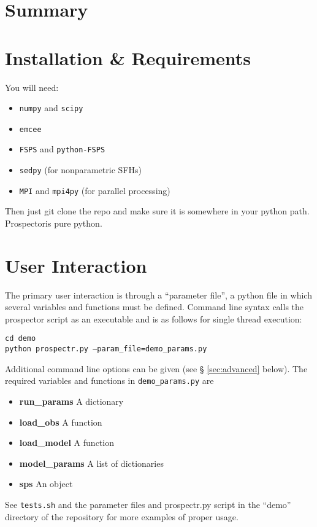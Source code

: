 \documentclass[12pt, letterpaper, preprint]{aastex}
\newcommand{\prospector}{Prospector}
\begin{document}
\section{Summary}

\section{Installation \& Requirements}
You will need:

\begin{itemize}
\item \texttt{numpy} and \texttt{scipy}
\item \texttt{emcee}
\item \texttt{FSPS} and \texttt{python-FSPS}
\item \texttt{sedpy} (for nonparametric SFHs)
\item \texttt{MPI} and \texttt{mpi4py} (for parallel processing)
\end{itemize}

Then just git clone the repo and make sure it is somewhere in your
python path.  \prospector is pure python.

\section{User Interaction}
The primary user interaction is through a ``parameter file'', a python
file in which several variables and functions must be defined. Command
line syntax calls the prospector script as an executable and is as
follows for single thread execution:
\begin{center}
\texttt{cd demo} \\
\texttt{python prospectr.py --param\_file=demo\_params.py}
\end{center}
Additional command line options can be given (see \S
\ref{sec:advanced} below). The required variables and functions in
\texttt{demo\_params.py} are
\begin{itemize}
\item {\bf run\_params} A dictionary
\item {\bf load\_obs} A function
\item {\bf load\_model} A function
\item {\bf model\_params} A list of dictionaries
\item {\bf sps} An object
\end{itemize}

See \texttt{tests.sh} and the parameter files and prospectr.py
script in the ``demo'' directory of the repository for more examples
of proper usage.
\end{document}
